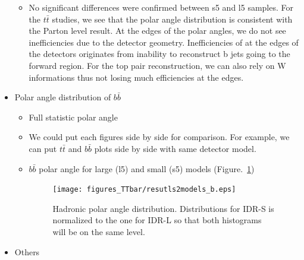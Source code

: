 \documentclass[preprint]{elsarticle}
\begin{document}
\begin{itemize}
\begin{itemize}
  \item No significant differences were confirmed between s5 and l5 samples. For the $t\bar{t}$ studies, we see that the polar angle distribution is consistent with the Parton level result. At the edges of the polar angles, we do not see inefficiencies due to the detector geometry. Inefficiencies of at the edges of the detectors originates from inability to reconstruct b jets going to the forward region. For the top pair reconstruction, we can also rely on W informations thus not losing much efficiencies at the edges.



\break

  

\end{itemize}

  
  \item Polar angle distribution of $b\bar{b}$
  \begin{itemize}
  \item Full statistic polar angle
  \item We could put each figures side by side for comparison. For example, we can put $t\bar{t}$ and $b\bar{b}$ plots side by side with same detector model.
  \item $b\bar{b}$ polar angle for large (l5) and small (s5) models (Figure.~\ref{compare_b})
  

     \begin{figure}[h!]
        \centering
        \texttt{[image: figures\_TTbar/resutls2models\_b.eps]} 
        \caption{Hadronic polar angle distribution. Distributions for IDR-S is normalized to the one for IDR-L so that both histograms will be on the same level.}
        \label{compare_b}
    \end{figure}

  
  \end{itemize}
  
  
  \break
  

  \item Others
      

\end{itemize}
\end{document}
